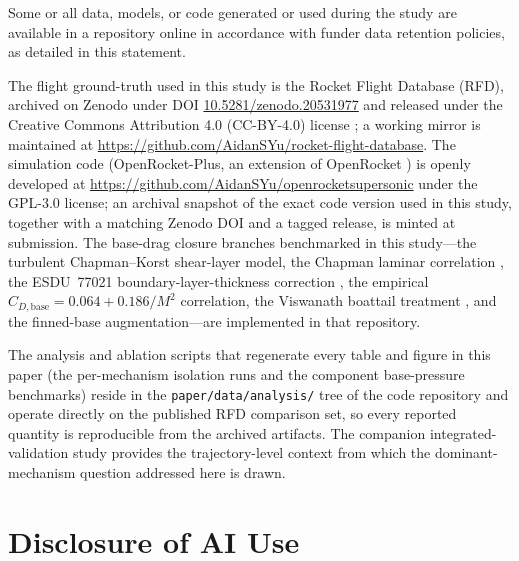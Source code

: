 
Some or all data, models, or code generated or used during the study are available
in a repository online in accordance with funder data retention policies, as detailed
in this statement.

The flight ground-truth used in this study is the Rocket Flight Database
(RFD), archived on Zenodo under DOI
\href{https://doi.org/10.5281/zenodo.20531977}{10.5281/zenodo.20531977} and released
under the Creative Commons Attribution 4.0 (CC-BY-4.0) license \cite{rfd_zenodo}; a
working mirror is maintained at
\url{https://github.com/AidanSYu/rocket-flight-database}. The simulation code
(OpenRocket-Plus, an extension of OpenRocket \cite{niskanen2009}) is openly developed at
\url{https://github.com/AidanSYu/openrocketsupersonic} under the GPL-3.0 license; an
archival snapshot of the exact code version used in this study, together with a matching
Zenodo DOI and a tagged release, is minted at submission. The base-drag closure
branches benchmarked in this study---the turbulent Chapman--Korst shear-layer model,
the Chapman laminar correlation \cite{chapman1950}, the ESDU~77021
boundary-layer-thickness correction \cite{esdu77021}, the empirical
$C_{D,\text{base}} = 0.064 + 0.186/M^2$ correlation, the Viswanath boattail treatment
\cite{viswanath1996}, and the finned-base augmentation---are implemented in that
repository.

The analysis and ablation scripts that regenerate every table and figure in this paper
(the per-mechanism isolation runs and the component base-pressure benchmarks) reside in
the \texttt{paper/data/analysis/} tree of the code repository and operate directly on the
published RFD comparison set, so every reported quantity is reproducible from the
archived artifacts. The companion integrated-validation study \cite{yu2026jsr} provides
the trajectory-level context from which the dominant-mechanism question addressed here is
drawn.

\section*{Disclosure of AI Use}

